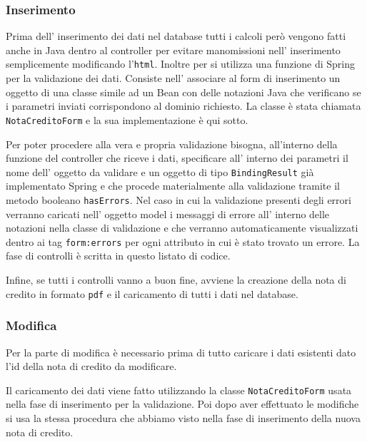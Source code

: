\documentclass[12pt]{book}
\begin{document}
\subsubsection{Inserimento}
Prima dell' inserimento dei dati nel database tutti i calcoli però vengono 
fatti anche in Java dentro al controller per evitare manomissioni 
nell' inserimento semplicemente modificando l'\texttt{html}.
Inoltre per si utilizza una funzione di Spring per la validazione dei dati.
Consiste nell' associare al form di inserimento un oggetto di una classe simile
ad un Bean con delle notazioni Java che verificano se i parametri inviati 
corrispondono al dominio richiesto. La classe è stata chiamata 
\texttt{NotaCreditoForm} e la sua implementazione è qui sotto.

Per poter procedere alla vera e propria validazione bisogna, all'interno della
funzione del controller che riceve i dati, specificare all' interno dei 
parametri il nome dell' oggetto da validare e un oggetto di tipo 
\texttt{BindingResult} già implementato Spring e che procede materialmente alla
validazione tramite il metodo booleano \texttt{hasErrors}.
Nel caso in cui la validazione presenti degli errori verranno caricati 
nell' oggetto model i messaggi di errore all' interno delle notazioni nella 
classe di validazione e che verranno automaticamente visualizzati dentro ai
tag \texttt{form:errors} per ogni attributo in cui è stato trovato un errore.
La fase di controlli è scritta in questo listato di codice.

Infine, se tutti i controlli vanno a buon fine, avviene la creazione della nota di 
credito in formato \texttt{pdf} e il caricamento di tutti i dati nel database.

\subsubsection{Modifica}
Per la parte di modifica è necessario prima di tutto caricare i dati esistenti
dato l'id della nota di credito da modificare.

Il caricamento dei dati viene fatto utilizzando la classe 
\texttt{NotaCreditoForm} usata nella fase di inserimento per la validazione.
Poi dopo aver effettuato le modifiche si usa la stessa procedura che abbiamo
visto nella fase di inserimento della nuova nota di credito.
\end{document}
